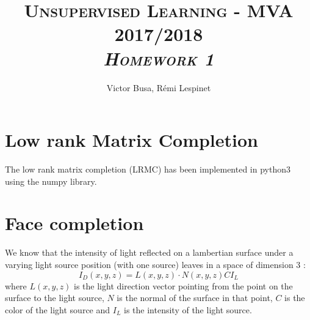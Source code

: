 \documentclass[a4paper, 11pt]{article}
\title{\textsc{Unsupervised Learning - MVA 2017/2018 \\ \emph{Homework 1}} }
\author{Victor Busa, Rémi Lespinet}
\date{}
\newcommand{\norm}[1]{\|#1\|}
\begin{document}
\maketitle
\thispagestyle{fancy}

\section{Low rank Matrix Completion}

The low rank matrix completion (LRMC) has been implemented in python3
using the numpy library.




\section{Face completion}



We know that the intensity of light reflected on a lambertian surface
under a varying light source position (with one source) leaves in a
space of dimension 3 :
\begin{equation*}
  I_D(x,y,z) = L(x, y, z) \cdot N(x,y,z) C I_L
\end{equation*}
where $L(x, y, z)$ is the light direction vector pointing from the
point on the surface to the light source, $N$ is the normal of the
surface in that point, $C$ is the color of the light source and $I_L$
is the intensity of the light source.
\end{document}
